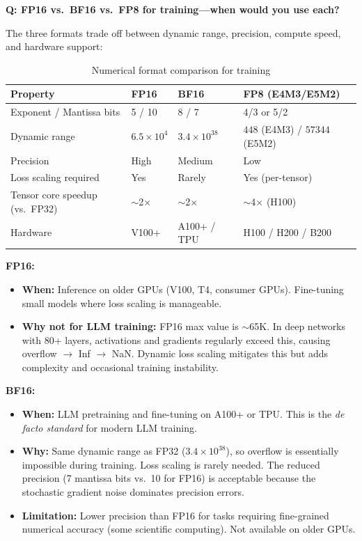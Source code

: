 \begin{interviewq}
\textbf{Q: FP16 vs.\ BF16 vs.\ FP8 for training---when would you use each?}

 \quad {} \quad \badgefreq{\freqmed}

\stronganswer

The three formats trade off between dynamic range, precision, compute speed, and hardware support:

\begin{table}[H]
\centering
\caption{Numerical format comparison for training}
\begin{tabularx}{\textwidth}{lXXX}
\toprule
\textbf{Property} & \textbf{FP16} & \textbf{BF16} & \textbf{FP8 (E4M3/E5M2)} \\
\midrule
Exponent / Mantissa bits & 5 / 10 & 8 / 7 & 4/3 or 5/2 \\
Dynamic range & $6.5 \times 10^4$ & $3.4 \times 10^{38}$ & $448$ (E4M3) / $57344$ (E5M2) \\
Precision & High & Medium & Low \\
Loss scaling required & Yes & Rarely & Yes (per-tensor) \\
Tensor core speedup (vs.\ FP32) & $\sim$2$\times$ & $\sim$2$\times$ & $\sim$4$\times$ (H100) \\
Hardware & V100+ & A100+ / TPU & H100 / H200 / B200 \\
\bottomrule
\end{tabularx}
\end{table}

\textbf{FP16:}
\begin{itemize}
    \item \textbf{When:} Inference on older GPUs (V100, T4, consumer GPUs). Fine-tuning small models where loss scaling is manageable.
    \item \textbf{Why not for LLM training:} FP16 max value is $\sim$65K. In deep networks with 80+ layers, activations and gradients regularly exceed this, causing overflow $\to$ Inf $\to$ NaN. Dynamic loss scaling mitigates this but adds complexity and occasional training instability.
\end{itemize}

\textbf{BF16:}
\begin{itemize}
    \item \textbf{When:} LLM pretraining and fine-tuning on A100+ or TPU. This is the \textit{de facto standard} for modern LLM training.
    \item \textbf{Why:} Same dynamic range as FP32 ($3.4 \times 10^{38}$), so overflow is essentially impossible during training. Loss scaling is rarely needed. The reduced precision (7 mantissa bits vs.\ 10 for FP16) is acceptable because the stochastic gradient noise dominates precision errors.
    \item \textbf{Limitation:} Lower precision than FP16 for tasks requiring fine-grained numerical accuracy (some scientific computing). Not available on older GPUs.
\end{itemize}


\end{interviewq}
